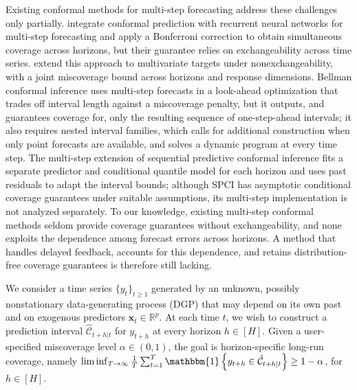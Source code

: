 \documentclass[
  american,
  12pt]{article}
\theoremstyle{plain}
\theoremstyle{plain}
\theoremstyle{remark}
\begin{document}
Existing conformal methods for multi-step forecasting address these
challenges only partially. \citet{stankeviciute2021} integrate conformal
prediction with recurrent neural networks for multi-step forecasting and
apply a Bonferroni correction to obtain simultaneous coverage across
horizons, but their guarantee relies on exchangeability across time
series. \citet{schlembach2025} extend this approach to multivariate
targets under nonexchangeability, with a joint miscoverage bound across
horizons and response dimensions. Bellman conformal inference
\citep{yang2024ts} uses multi-step forecasts in a look-ahead
optimization that trades off interval length against a miscoverage
penalty, but it outputs, and guarantees coverage for, only the resulting
sequence of one-step-ahead intervals; it also requires nested interval
families, which calls for additional construction when only point
forecasts are available, and solves a dynamic program at every time
step. The multi-step extension of sequential predictive conformal
inference \citep[SPCI,][]{xu2023} fits a separate predictor and
conditional quantile model for each horizon and uses past residuals to
adapt the interval bounds; although SPCI has asymptotic conditional
coverage guarantees under suitable assumptions, its multi-step
implementation is not analyzed separately. To our knowledge, existing
multi-step conformal methods seldom provide coverage guarantees without
exchangeability, and none exploits the dependence among forecast errors
across horizons. A method that handles delayed feedback, accounts for
this dependence, and retains distribution-free coverage guarantees is
therefore still lacking.

We consider a time series \(\{y_t\}_{t\ge1}\) generated by an unknown,
possibly nonstationary data-generating process (DGP) that may depend on
its own past and on exogenous predictors \(\bm{x}_t\in\mathbb{R}^p\). At
each time \(t\), we wish to construct a prediction interval
\(\hat{\mathcal{C}}_{t+h|t}\) for \(y_{t+h}\) at every horizon
\(h\in[H]\). Given a user-specified miscoverage level
\(\alpha\in(0,1)\), the goal is horizon-specific long-run coverage,
namely
\(\liminf_{T\to\infty}\frac{1}{T}\sum_{t=1}^{T}\mathbbm{1}\left\{y_{t+h}\in\hat{\mathcal{C}}_{t+h|t}\right\}\geq 1-\alpha\),
for \(h\in[H]\).
\end{document}
